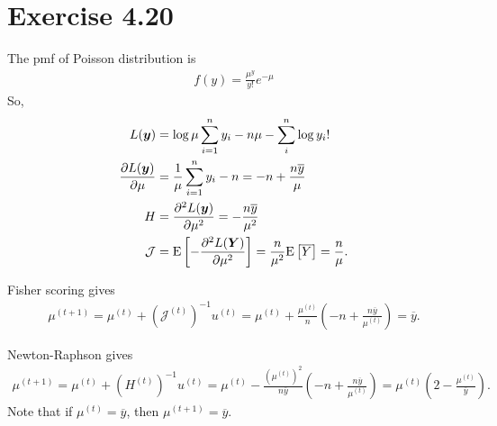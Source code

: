 \section*{Exercise 4.20}
The pmf of Poisson distribution is
\begin{align*}
f(y) = \frac{\mu^{y}}{y!}e^{-\mu}
\end{align*}
So,
\begin{align*}
L(\bm{y}) &= \log\mu\sum_{i=1}^{n}y_{i} - n\mu -\sum_{i}^{n}\log y_{i}!\\
\frac{\partial L(\bm{y})}{\partial \mu} &= \frac{1}{\mu}\sum_{i=1}^{n}y_{i} -n = -n +\frac{n\overline{y}}{\mu}\\
H &= \frac{\partial^{2} L(\bm{y})}{\partial \mu^{2}} = -\frac{n\overline{y}}{\mu^{2}}\\
\mathcal{J} &= \mathrm{E}\left[-\frac{\partial^{2} L(\bm{Y})}{\partial \mu^{2}}\right] = \frac{n}{\mu^{2}}\mathrm{E}\left[\overline{Y}\right] = \frac{n}{\mu}.
\end{align*}

Fisher scoring gives
\begin{align*}
\mu^{(t+1)} = \mu^{(t)} + \left(\mathcal{J}^{(t)}\right)^{-1}u^{(t)} = \mu^{(t)} + \frac{\mu^{(t)}}{n}\left(-n +\frac{n\overline{y}}{\mu^{(t)}}\right) = \overline{y}.
\end{align*}

Newton-Raphson gives
\begin{align*}
\mu^{(t+1)} = \mu^{(t)} + \left(H^{(t)}\right)^{-1}u^{(t)} = \mu^{(t)} -\frac{\left(\mu^{(t)}\right)^{2}}{n\overline{y}}\left(-n +\frac{n\overline{y}}{\mu^{(t)}}\right) = \mu^{(t)}\left(2 - \frac{\mu^{(t)}}{\overline{y}}\right).
\end{align*}
Note that if $\mu^{(t)} = \overline{y}$, then $\mu^{(t+1)} = \overline{y}$.